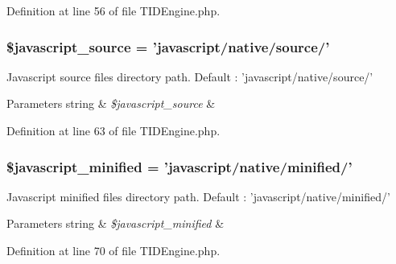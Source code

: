 Definition at line 56 of file TIDEngine.php.

\hypertarget{group__paths__settings_ga2f10132b94f95d29119dbfc721ec89f5}{
\subsubsection[{\$javascript\_\-source}]{\setlength{\rightskip}{0pt plus 5cm}\$javascript\_\-source = 'javascript/native/source/'}}
\label{group__paths__settings_ga2f10132b94f95d29119dbfc721ec89f5}
Javascript source files directory path. Default : 'javascript/native/source/' 
\begin{DoxyParams}[1]{Parameters}
string & {\em \$javascript\_\-source} & \\
\hline
\end{DoxyParams}


Definition at line 63 of file TIDEngine.php.

\hypertarget{group__paths__settings_gaf110565a1dfb60e0e30898d5087688be}{
\subsubsection[{\$javascript\_\-minified}]{\setlength{\rightskip}{0pt plus 5cm}\$javascript\_\-minified = 'javascript/native/minified/'}}
\label{group__paths__settings_gaf110565a1dfb60e0e30898d5087688be}
Javascript minified files directory path. Default : 'javascript/native/minified/' 
\begin{DoxyParams}[1]{Parameters}
string & {\em \$javascript\_\-minified} & \\
\hline
\end{DoxyParams}


Definition at line 70 of file TIDEngine.php.

